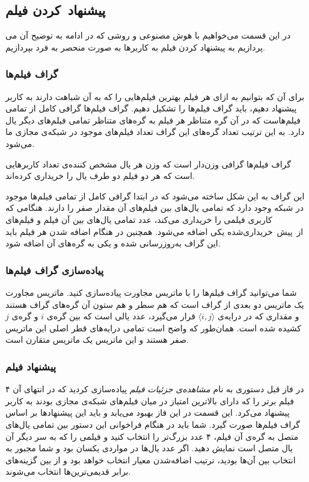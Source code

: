 \documentclass{utap}
\begin{document}
    \subsection{پیشنهاد~کردن فیلم}

    در این قسمت می‌خواهیم با هوش مصنوعی و روشی که در ادامه به توضیح آن می پردازیم به پیشنهاد کردن فیلم به کاربر‌ها به صورت منحصر به فرد بپردازیم.

    \subsubsection{گراف فیلم‌ها}

    برای آن ‌که بتوانیم به ازای هر فیلم بهترین فیلم‌هایی را که به آن شباهت دارند به کاربر پیشنهاد دهیم، باید گراف فیلم‌ها را تشکیل دهیم. گراف فیلم‌ها گرافی کامل از تمامی فیلم‌هاست که در آن گره متناظر هر فیلم به گره‌های متناظر تمامی فیلم‌های دیگر یال دارد. به این ترتیب تعداد گره‌های این گراف تعداد فیلم‌های موجود در شبکه‌ی مجازی ما می‌شود.

    گراف فیلم‌‌ها گرافی وزن‌دار است که وزن هر یال مشخص کننده‌ی تعداد کاربر‌هایی است که هر دو فیلم دو طرف یال را خریداری  کرده‌اند.

    این گراف به این شکل ساخته می‌شود که در ابتدا گرافی کامل از تمامی فیلم‌ها موجود در شبکه وجود دارد که تمامی یال‌های بین فیلم‌های آن مقدار صفر را دارند. هنگامی که کاربری فیلمی را خریداری می‌کند، عدد تمامی یال‌های بین آن فیلم و فیلم‌های از~پیش~خریداری‌شده یکی اضافه می‌شود. همچنین در هنگام اضافه شدن هر فیلم باید این گراف به‌روز‌رسانی شده و یکی به گره‌های آن اضافه شود.

    \subsubsection{پیاده‌سازی گراف فیلم‌ها}

    شما می‌توانید گراف فیلم‌ها را با ماتریس مجاورت پیاده‌سازی کنید. ماتریس مجاورت یک ماتریس دو بعدی از گراف است که هم سطر و هم ستون آن گره‌های گراف هستند و مقداری که در درایه‌ی $\langle i, j\rangle$ قرار می‌گیرد، عدد یالی است که بین گره‌ی $i$ و گره‌ی $j$ کشیده شده است.
    همان‌طور که واضح است تمامی درایه‌های قطر اصلی این ماتریس صفر هستند و این ماتریس یک ماتریس متقارن است.

    \subsubsection{پیشنهاد فیلم}

    در فاز قبل دستوری به نام \textit{مشاهده‌ی جزئیات فیلم} پیاده‌سازی کردید که در انتهای آن ۴ فیلم برتر را که دارای بالاترین امتیاز در میان فیلم‌های شبکه‌ی مجازی بودند به کاربر پیشنهاد می‌کرد. این قسمت در این فاز بهبود می‌یابد و باید این پیشنهادها بر اساس گراف فیلم‌ها صورت گیرد. شما باید در هنگام فراخوانی این دستور بین تمامی یال‌های متصل به گره‌ی آن فیلم، ۴ عدد بزرگ‌تر را انتخاب کنید و فیلمی را که به سر دیگر آن یال متصل است نمایش دهید. اگر عدد یال‌ها در مواردی یکسان بود و شما مجبور به انتخاب بین آن‌ها بودید، ترتیب اضافه‌شدن معیار انتخاب خواهد بود و از بین گزینه‌های برابر قدیمی‌ترین‌ها انتخاب می‌شوند.
\end{document}
